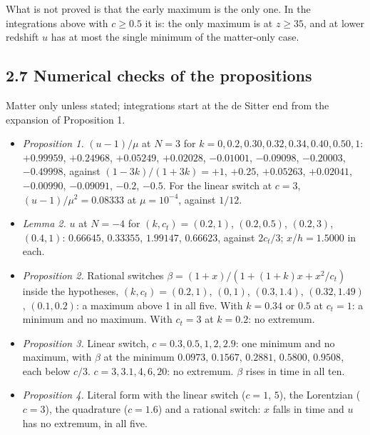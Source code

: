 \documentclass[11pt,a4paper]{article}
\begin{document}
What is not proved is that the early maximum is the only one. In the integrations above with
$c \ge 0.5$ it is: the only maximum is at $z \ge 35$, and at lower redshift $u$ has at most the single minimum of the
matter-only case.


\subsection*{2.7 Numerical checks of the propositions}
Matter only unless stated; integrations start at the de Sitter end from the expansion of Proposition 1.

\begin{itemize}
\item{} \emph{Proposition 1.} $(u - 1)/\mu$ at $N = 3$ for $k = 0, 0.2, 0.30, 0.32, 0.34, 0.40, 0.50, 1$: $+0.99959$, $+0.24968$,
$+0.05249$, $+0.02028$, $-0.01001$, $-0.09098$, $-0.20003$, $-0.49998$, against $(1 - 3k)/(1 + 3k) = +1$, $+0.25$,
$+0.05263$, $+0.02041$, $-0.00990$, $-0.09091$, $-0.2$, $-0.5$. For the linear switch at $c = 3$,
$(u - 1)/\mu^2 = 0.08333$ at $\mu = 10^{-4}$, against $1/12$.
\item{} \emph{Lemma 2.} $u$ at $N = -4$ for $(k, c_t) = (0.2, 1)$, $(0.2, 0.5)$, $(0.2, 3)$, $(0.4, 1)$: $0.66645$, $0.33355$,
$1.99147$, $0.66623$, against $2c_t/3$; $x/h = 1.5000$ in each.
\item{} \emph{Proposition 2.} Rational switches $\beta = (1 + x)/(1 + (1 + k)x + x^2/c_t)$ inside the hypotheses,
$(k, c_t) = (0.2, 1)$, $(0, 1)$, $(0.3, 1.4)$, $(0.32, 1.49)$, $(0.1, 0.2)$: a maximum above 1 in all five. With
$k = 0.34$ or $0.5$ at $c_t = 1$: a minimum and no maximum. With $c_t = 3$ at $k = 0.2$: no extremum.
\item{} \emph{Proposition 3.} Linear switch, $c = 0.3, 0.5, 1, 2, 2.9$: one minimum and no maximum, with $\beta$ at the minimum
$0.0973$, $0.1567$, $0.2881$, $0.5800$, $0.9508$, each below $c/3$. $c = 3, 3.1, 4, 6, 20$: no extremum. $\beta$ rises
in time in all ten.
\item{} \emph{Proposition 4.} Literal form with the linear switch ($c = 1$, $5$), the Lorentzian ($c = 3$), the quadrature
($c = 1.6$) and a rational switch: $x$ falls in time and $u$ has no extremum, in all five.
\end{itemize}
\end{document}
